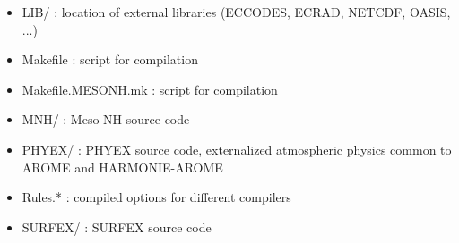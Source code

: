 \begin{itemize}
\begin{itemize}
\item LIB/ : location of external libraries (ECCODES, ECRAD, NETCDF, OASIS, ...)
\item Makefile : script for compilation
\item Makefile.MESONH.mk : script for compilation
\item MNH/ : Meso-NH source code
\item PHYEX/ : PHYEX source code, externalized atmospheric physics common to AROME and HARMONIE-AROME
\item Rules.* : compiled options for different compilers
\item SURFEX/ : SURFEX source code
\end{itemize}
\end{itemize}

